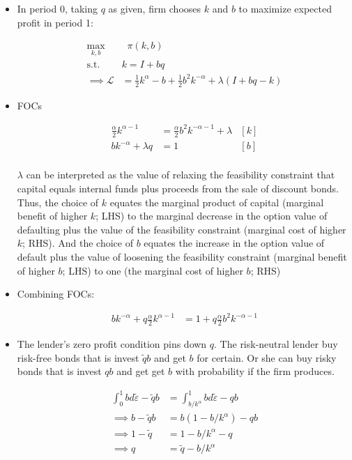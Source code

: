 \documentclass{article}
\newcommand{\Lfn}{\mathcal{L}}
\begin{document}
\begin{itemize}
\item In period 0, taking $q$ as given, firm chooses $k$ and $b$ to maximize expected profit in period 1:

\begin{align*}
\max_{k,b} & \;\;\pi(k,b) \\ 
\text{s.t. } & k = I + bq \\
\implies
\Lfn &= \frac{1}{2} k^\alpha - b + \frac{1}{2}b^2 k^{-\alpha} + \lambda (I + bq - k)
\end{align*}

\item FOCs

\begin{align*}
\frac{\alpha}{2} k^{\alpha-1} &= \frac{\alpha}{2}b^2 k^{-\alpha-1} + \lambda & [k] \\
 b k^{-\alpha} + \lambda q &= 1 & [b] \\
\end{align*}

$\lambda$ can be interpreted as the value of relaxing the feasibility constraint that capital equals internal funds plus proceeds from the sale of discount bonds.  Thus, the choice of $k$ equates the marginal product of capital (marginal benefit of higher $k$; LHS) to the marginal decrease in the option value of defaulting plus the value of the feasibility constraint (marginal cost of higher $k$; RHS). And the choice of $b$ equates the increase in the option value of default plus the value of loosening the feasibility constraint (marginal benefit of higher $b$; LHS) to one (the marginal cost of higher $b$; RHS)

\item Combining FOCs:

\begin{align*}
 b k^{-\alpha} + q\frac{\alpha}{2} k^{\alpha-1} &= 1 + q\frac{\alpha}{2}b^2 k^{-\alpha-1} 
\end{align*}

\item The lender's zero profit condition pins down $q$.  The risk-neutral lender buy risk-free bonds that is invest $\tilde q b$ and get $b$ for certain. Or she can buy risky bonds that is invest $q b$ and get get $b$ with probability if the firm produces.

\begin{align*}
\int_0^1b d\tilde \varepsilon - \tilde q b &= \int_{b/k^\alpha}^1 b d \tilde \varepsilon - qb \\ 
\implies
b - \tilde q b &= b (1-b/k^\alpha) - qb \\ 
\implies
1 - \tilde q &= 1-b/k^\alpha - q\\ 
\implies
q &= \tilde q - b/k^\alpha
\end{align*}


\end{itemize}
\end{document}
